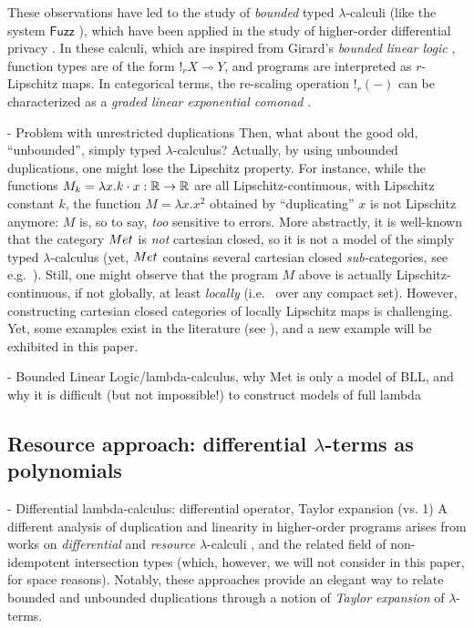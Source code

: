 These observations have led to the study of \emph{bounded} typed $\lambda$-calculi (like the system $\mathsf{Fuzz}$ \cite{Reed_2010}),
which have been applied in the study of higher-order differential privacy \cite{}. In these calculi, which are inspired from Girard's \emph{bounded linear logic} \cite{}, function types are of the form $!_{r}X \multimap Y$, and programs are interpreted as $r$-Lipschitz maps. In categorical terms, the re-scaling operation $!_{r}(-)$ can be characterized as a  \emph{graded linear exponential comonad} \cite{}. 

- Problem with unrestricted duplications
Then, what about the good old, ``unbounded'', simply typed $\lambda$-calculus? Actually, by using unbounded duplications, one might lose the Lipschitz property. For instance, while the functions $M_{k}=\lambda x. k\cdot x: \mathbb{R}\to \mathbb{R}$ are all Lipschitz-continuous, with Lipschitz constant $k$, the function $M=\lambda x.x^{2}$ obtained by ``duplicating'' $x$ is not Lipschitz anymore: $M$ is, so to say, \emph{too} sensitive to errors. 
More abstractly, it is well-known that the category $\Met$ is \emph{not} cartesian closed, so it is not a model of the simply typed $\lambda$-calculus (yet, $\Met$ contains several cartesian closed \emph{sub-}categories, see e.g.~\cite{}).
Still, one might observe that the program $M$ above is actually Lipschitz-continuous, if not globally, at least \emph{locally} (i.e.~ over any compact set). However, constructing cartesian closed categories of locally Lipschitz maps is challenging. Yet, some examples exist in the literature (see \cite{EhrhardPCOHdiff, PistoneLICS2021}), and a new example will be exhibited in this paper.

- Bounded Linear Logic/lambda-calculus, why Met is only a model of BLL, and why it is difficult (but not impossible!) to construct models of full lambda
%
%

\subsection{Resource approach: differential $\lambda$-terms as polynomials}

- Differential lambda-calculus: differential operator, Taylor expansion (vs. 1)
A different analysis of duplication and linearity in higher-order programs arises from works on \emph{differential} and \emph{resource} $\lambda$-calculi \cite{}, and the related field of non-idempotent intersection types (which, however, we will not consider in this paper, for space reasons).
Notably, these approaches provide an elegant way to relate bounded and unbounded duplications through a notion of  \emph{Taylor expansion} of $\lambda$-terms.   

